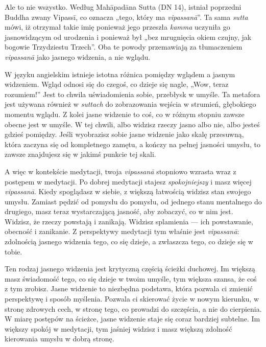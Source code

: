 \documentclass[12pt,openany]{book}
\begin{document}
Ale to nie wszystko. Według Mahāpadāna Sutta (DN 14), istniał poprzedni Buddha zwany Vipassī, co oznacza „tego, który ma \textit{vipassanā}”. Ta sama \textit{sutta} mówi, iż otrzymał takie imię ponieważ jego przeszła  \textit{kamma} uczyniła go jasnowidzącym od urodzenia i ponieważ był „bez mrugnięcia okiem czujny, jak bogowie Trzydziestu Trzech”. Oba te powody przemawiają za tłumaczeniem  \textit{vipassanā} jako jasnego widzenia, a nie wglądu.

W języku angielskim istnieje istotna różnica pomiędzy wglądem a jasnym widzeniem. Wgląd odnosi się do czegoś, co dzieje się nagle, „Wow, teraz rozumiem!” Jest to chwila uświadomienia sobie, przebłysk w umyśle. Ta metafora jest używana również w \textit{suttach} do zobrazowania wejścia w strumień, głębokiego momen\-tu wglądu. Z kolei jasne widzenie to coś, co w różnym stopniu zawsze obecne jest w umyśle. W tej chwili, albo widzisz rzeczy jasno albo nie, albo jesteś gdzieś pomiędzy. Jeśli wyobrazisz sobie jasne widzenie jako skalę przesuwną, która zaczyna się od kompletnego zamętu, a kończy na pełnej jasności umysłu, to zawsze znajdujesz się w jakimś punkcie tej skali.

A więc w kontekście medytacji, twoja \textit{vipassanā} stopniowo \linebreak wzrasta wraz z postępem w medytacji. Po dobrej medytacji stajesz \textit{spokojniejszy} i masz więcej \textit{vipassanā}. Kiedy spoglądasz w siebie, z większą łatwością widzisz stan swojego umysłu. Zamiast pędzić od pomysłu do pomysłu, od jednego stanu mentalnego do drugiego, masz teraz wystarczającą jasność, aby zobaczyć, co w nim jest. Widzisz, że rzeczy powstają i zanikają. Widzisz splamienia --- ich powstawanie, obecność i zanikanie. Z perspektywy medytacji tym właśnie jest \textit{vipassanā}: zdolnością jasnego widzenia tego, co się dzieje, a zwłaszcza tego, co dzieje się w tobie.

Ten rodzaj jasnego widzenia jest krytyczną częścią ścieżki duchowej. Im większą masz świadomość tego, co się dzieje w twoim umyśle, tym większa szansa, że coś z tym zrobisz. Jasne widzenie to niezbędna podstawa, która pozwala ci zmienić perspektywę i sposób myślenia. Pozwala ci skierować życie w nowym kierunku, w stronę zdrowych cech, w stronę tego, co prowadzi do szczęścia, a nie do cierpienia. W miarę postępów na ścieżce, jasne widzenie staje się coraz bardziej subtelne. Im większy spokój w medytacji, tym jaśniej widzisz i masz większą zdolność kierowania umysłu w dobrą stronę.
\end{document}

